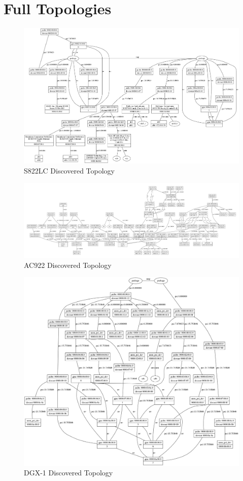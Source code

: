 \chapter{Full Topologies}
\label{ch:full-topos}

\begin{figure}[ht]
    \centering
    \includegraphics[width=\textwidth]{figures/topo-minsky-actual.png}
    \caption{S822LC Discovered Topology}
    \label{fig:topo-minsky-actual}
\end{figure}

\begin{figure}[ht]
    \centering
    \includegraphics[width=\textwidth]{figures/topo-ac922-actual.pdf}
    \caption{AC922 Discovered Topology}
    \label{fig:topo-ac922-actual}
\end{figure}

\begin{figure}[ht]
    \centering
    \includegraphics[width=\textwidth]{figures/topo-dgx1-actual.png}
    \caption{DGX-1 Discovered Topology}
    \label{fig:topo-dgx-actual}
\end{figure}